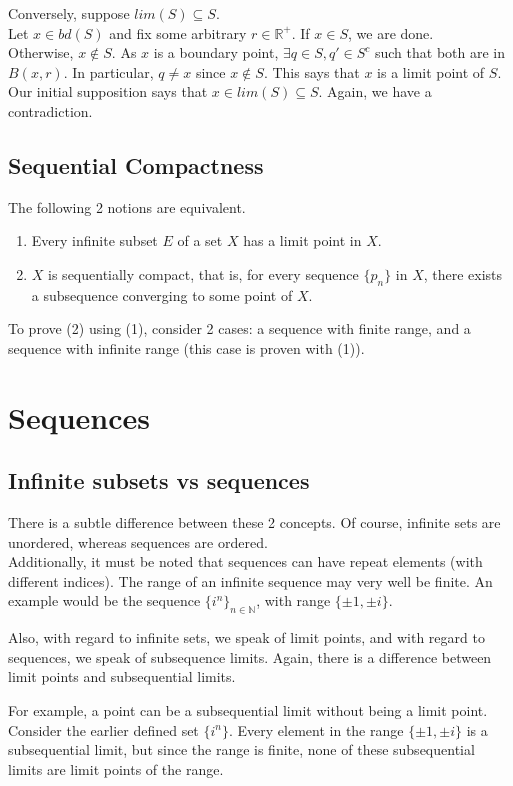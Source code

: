 \documentclass{article}
\begin{document}
Conversely, suppose $lim(S)\subseteq S$.\\
Let $x\in bd(S)$ and fix some arbitrary $r\in \mathbb{R}^+$. If $x\in S$, we are done.\\
Otherwise, $x\not \in S$. As $x$ is a boundary point, $\exists q\in S, q' \in S^c$ such that both are in $B(x,r)$. In particular, $q\neq x$ since $x\not \in S$. This says that $x$ is a limit point of $S$.\\
Our initial supposition says that $x\in lim(S)\subseteq S$. Again, we have a contradiction.  

\subsection{Sequential Compactness}
The following 2 notions are equivalent.
\begin{enumerate}
	\item Every infinite subset $E$ of a set $X$ has a limit point in $X$.
	\item $X$ is sequentially compact, that is, for every sequence $\{p_n\}$ in $X$, there exists a subsequence converging to some point of $X$.
\end{enumerate}

To prove (2) using (1), consider 2 cases: a sequence with finite range, and a sequence with infinite range (this case is proven with (1)).

\section{Sequences}
\subsection{Infinite subsets vs sequences}
There is a subtle difference between these 2 concepts. Of course, infinite sets are unordered, whereas sequences are ordered. \\
Additionally, it must be noted that sequences can have repeat elements (with different indices). The range of an infinite sequence may very well be finite. An example would be the sequence $\{i^n\}_{n\in \mathbb{N}}$, with range $\{\pm 1, \pm i\}$.

Also, with regard to infinite sets, we speak of limit points, and with regard to sequences, we speak of subsequence limits. Again, there is a difference between limit points and subsequential limits.

For example, a point can be a subsequential limit without being a limit point. Consider the earlier defined set $\{i^n\}$. Every element in the range $\{\pm 1, \pm i\}$ is a subsequential limit, but since the range is finite, none of these subsequential limits are limit points of the range.
\end{document}
